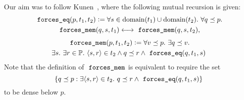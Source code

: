 Our aim was to follow Kunen~\cite[p.~257]{kunen2011set}, where the
following mutual recursion is given:
\begin{multline}\label{eq:def-forcing-equality}
  \forceseq (p,t_1,t_2) \defi 
  \forall s\in\dom(t_1)\cup\dom(t_2).\ \forall q\pleq p .\\
  \forcesmem(q,s,t_1)\lsii 
  \forcesmem(q,s,t_2),
\end{multline}
\begin{multline}\label{eq:def-forcing-membership}
  \forcesmem(p,t_1,t_2) \defi  \forall v\pleq p. \ \exists q\pleq v. \\
  \exists s.\ \exists r\in \PP .\ \lb s,r\rb \in
      t_2 \land q \pleq r \land \forceseq(q,t_1,s)
\end{multline}
Note that the definition of $\forcesmem$ is equivalent to require 
 the set 
\[
\{q\pleq p : \exists \lb s,r\rb\in t_2 . \ q\pleq r \land \forceseq(q,t_1,s)\}
\]
to be dense below $p$.

